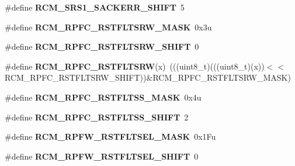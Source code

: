 \begin{DoxyCompactItemize}
\item 
\#define {\bfseries R\+C\+M\+\_\+\+S\+R\+S1\+\_\+\+S\+A\+C\+K\+E\+R\+R\+\_\+\+S\+H\+I\+FT}~5\hypertarget{group__RCM__Register__Masks_gab30a0b3f954edb8a480649686bd208fb}{}\label{group__RCM__Register__Masks_gab30a0b3f954edb8a480649686bd208fb}

\item 
\#define {\bfseries R\+C\+M\+\_\+\+R\+P\+F\+C\+\_\+\+R\+S\+T\+F\+L\+T\+S\+R\+W\+\_\+\+M\+A\+SK}~0x3u\hypertarget{group__RCM__Register__Masks_ga36e0fc448dc94b90314dd6dd2dd41763}{}\label{group__RCM__Register__Masks_ga36e0fc448dc94b90314dd6dd2dd41763}

\item 
\#define {\bfseries R\+C\+M\+\_\+\+R\+P\+F\+C\+\_\+\+R\+S\+T\+F\+L\+T\+S\+R\+W\+\_\+\+S\+H\+I\+FT}~0\hypertarget{group__RCM__Register__Masks_gad869b7629ba10023abe459d7293fd281}{}\label{group__RCM__Register__Masks_gad869b7629ba10023abe459d7293fd281}

\item 
\#define {\bfseries R\+C\+M\+\_\+\+R\+P\+F\+C\+\_\+\+R\+S\+T\+F\+L\+T\+S\+RW}(x)~(((uint8\+\_\+t)(((uint8\+\_\+t)(x))$<$$<$R\+C\+M\+\_\+\+R\+P\+F\+C\+\_\+\+R\+S\+T\+F\+L\+T\+S\+R\+W\+\_\+\+S\+H\+I\+FT))\&R\+C\+M\+\_\+\+R\+P\+F\+C\+\_\+\+R\+S\+T\+F\+L\+T\+S\+R\+W\+\_\+\+M\+A\+SK)\hypertarget{group__RCM__Register__Masks_ga9e84ee177022331e8509773374670eca}{}\label{group__RCM__Register__Masks_ga9e84ee177022331e8509773374670eca}

\item 
\#define {\bfseries R\+C\+M\+\_\+\+R\+P\+F\+C\+\_\+\+R\+S\+T\+F\+L\+T\+S\+S\+\_\+\+M\+A\+SK}~0x4u\hypertarget{group__RCM__Register__Masks_gadfb0f8132fbbc978c9756a2adfbf2ed0}{}\label{group__RCM__Register__Masks_gadfb0f8132fbbc978c9756a2adfbf2ed0}

\item 
\#define {\bfseries R\+C\+M\+\_\+\+R\+P\+F\+C\+\_\+\+R\+S\+T\+F\+L\+T\+S\+S\+\_\+\+S\+H\+I\+FT}~2\hypertarget{group__RCM__Register__Masks_ga4c39eb26fa537bf5e4e6b0ea82ffaeb2}{}\label{group__RCM__Register__Masks_ga4c39eb26fa537bf5e4e6b0ea82ffaeb2}

\item 
\#define {\bfseries R\+C\+M\+\_\+\+R\+P\+F\+W\+\_\+\+R\+S\+T\+F\+L\+T\+S\+E\+L\+\_\+\+M\+A\+SK}~0x1\+Fu\hypertarget{group__RCM__Register__Masks_ga60f29f78d245476ae9716d81b5728739}{}\label{group__RCM__Register__Masks_ga60f29f78d245476ae9716d81b5728739}

\item 
\#define {\bfseries R\+C\+M\+\_\+\+R\+P\+F\+W\+\_\+\+R\+S\+T\+F\+L\+T\+S\+E\+L\+\_\+\+S\+H\+I\+FT}~0\hypertarget{group__RCM__Register__Masks_ga489d9757284af48af000b769d36bf21a}{}\label{group__RCM__Register__Masks_ga489d9757284af48af000b769d36bf21a}


\end{DoxyCompactItemize}
